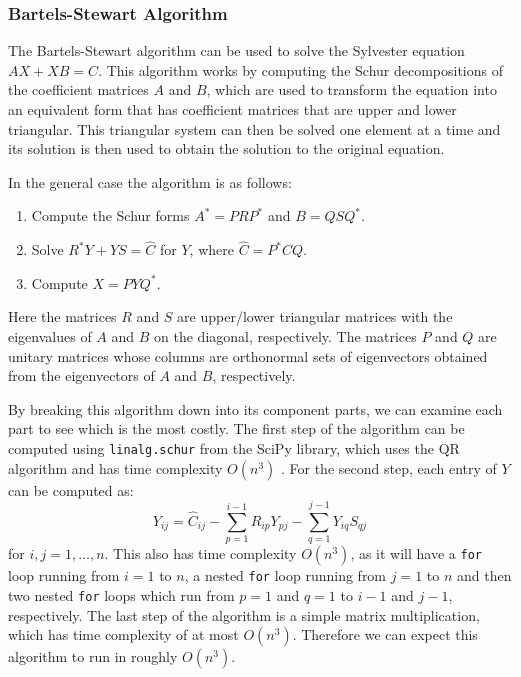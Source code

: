 \documentclass[11pt]{article}
\numberwithin{equation}{section}
\begin{document}
\subsubsection{Bartels-Stewart Algorithm}
The Bartels-Stewart algorithm \cite{Bartels} can be used to solve the Sylvester equation $AX + XB = C$. 
This algorithm works by computing the Schur decompositions of the coefficient matrices $A$ and $B$, which are used to transform the equation into an equivalent form that has coefficient matrices that are upper and lower triangular. This triangular system can then be solved one element at a time and its solution is then used to obtain the solution to the original equation.

In the general case the algorithm is as follows:
\begin{enumerate}
\item Compute the Schur forms $A^* = PRP^*$ and $B=QSQ^*$.
\item Solve $R^*Y + YS = \hat{C}$ for $Y$, where $\hat{C} = P^*CQ$.
\item Compute $X=PYQ^*$.
\end{enumerate}
Here the matrices $R$ and $S$ are upper/lower triangular matrices with the eigenvalues of $A$ and $B$ on the diagonal, respectively. The matrices $P$ and $Q$ are unitary matrices whose columns are orthonormal sets of eigenvectors obtained from the eigenvectors of $A$ and $B$, respectively.

By breaking this algorithm down into its component parts, we can examine each part to see which is the most costly. The first step of the algorithm can be computed using \texttt{linalg.schur} from the SciPy library, which uses the QR algorithm and has time complexity $O(n^3)$ \cite{Parlett}. For the second step, each entry of $Y$ can be computed as:
\begin{equation}
Y_{ij} = \hat{C}_{ij} - \sum_{p=1}^{i-1} R_{ip}Y_{pj} - \sum_{q=1}^{j-1} Y_{iq}S_{qj}
\end{equation}
for $i,j=1, \dots, n$. This also has time complexity $O(n^3)$, as it will have a \texttt{for} loop running from $i=1$ to $n$, a nested \texttt{for} loop running from $j=1$ to $n$ and then two nested \texttt{for} loops which run from $p=1$ and $q=1$ to $i-1$ and $j-1$, respectively. The last step of the algorithm is a simple matrix multiplication, which has time complexity of at most $O(n^3)$. Therefore we can expect this algorithm to run in roughly $O(n^3)$. 
\end{document}
